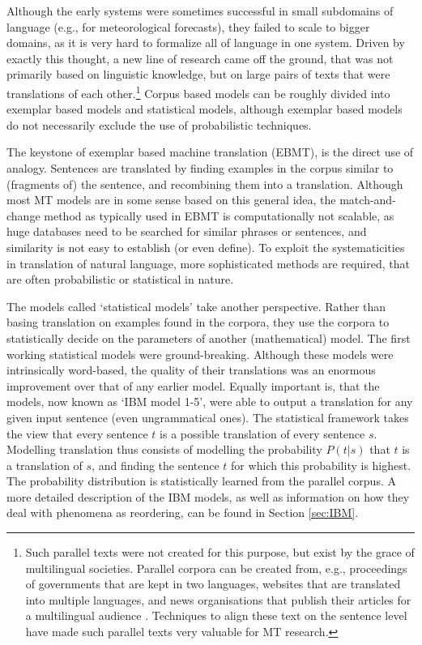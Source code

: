 Although the early systems were sometimes successful in small subdomains of language (e.g., \cite{chandioux1976meteo} for meteorological forecasts), they failed to scale to bigger domains, as it is very hard to formalize all of language in one system. Driven by exactly this thought, a new line of research came off the ground, that was not primarily based on linguistic knowledge, but on large pairs of texts that were translations of each other.\footnote{Such parallel texts were not created for this purpose, but exist by the grace of multilingual societies. Parallel corpora can be created from, e.g., proceedings of governments that are kept in two languages, websites that are translated into multiple languages, and news organisations that publish their articles for a multilingual audience \citep{koehn2008statistical}. Techniques to align these text on the sentence level \citep[e.g.,][]{varga2007parallel} have made such parallel texts very valuable for MT research.} Corpus based models can be roughly divided into exemplar based models and statistical models, although exemplar based models do not necessarily exclude the use of probabilistic techniques.

The keystone of exemplar based machine translation (EBMT), is the direct use of analogy. Sentences are translated by finding examples in the corpus similar to (fragments of) the sentence, and recombining them into a translation. Although most MT models are in some sense based on this general idea, the match-and-change method as typically used in EBMT is computationally not scalable, as huge databases need to be searched for similar phrases or sentences, and similarity is not easy to establish (or even define). To exploit the systematicities in translation of natural language, more sophisticated methods are required, that are often probabilistic or statistical in nature.


The models called `statistical models' take another perspective. Rather than basing translation on examples found in the corpora, they use the corpora to statistically decide on the parameters of another (mathematical) model. The first working statistical models \citep{brown1988statistical,brown1990statistical,brown1993mathematics} were ground-breaking. Although these models were intrinsically word-based, the quality of their translations was an enormous improvement over that of any earlier model. Equally important is, that the models, now known as `IBM model 1-5', were able to output a translation for any given input sentence (even ungrammatical ones). The statistical framework takes the view that every sentence $t$ is a possible translation of every sentence $s$. Modelling translation thus consists of modelling the probability $P(t|s)$ that $t$ is a translation of $s$, and finding the sentence $t$ for which this probability is highest. The probability distribution is statistically learned from the parallel corpus. A more detailed description of the IBM models, as well as information on how they deal with phenomena as reordering, can be found in Section \ref{sec:IBM}.

